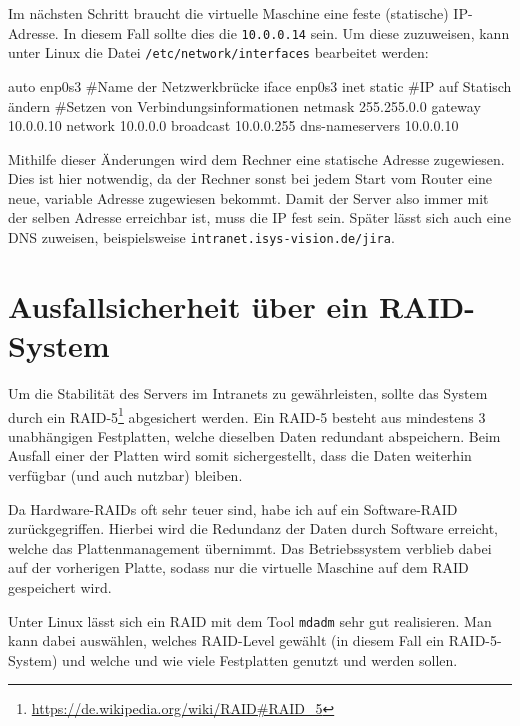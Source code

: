 Im nächsten Schritt braucht die virtuelle Maschine eine feste (statische) IP-Adresse.
In diesem Fall sollte dies die \texttt{10.0.0.14} sein. Um diese zuzuweisen, kann
unter Linux die Datei \texttt{/etc/network/interfaces} bearbeitet werden:

\begin{code}[language=bash, caption={Änderungen in \texttt{/etc/network/interfaces}}]
auto enp0s3 #Name der Netzwerkbrücke
iface enp0s3 inet static #IP auf Statisch ändern
#Setzen von Verbindungsinformationen
netmask 255.255.0.0
gateway 10.0.0.10
network 10.0.0.0
broadcast 10.0.0.255
dns-nameservers 10.0.0.10
\end{code}

Mithilfe dieser Änderungen wird dem Rechner eine statische Adresse zugewiesen. Dies
ist hier notwendig, da der Rechner sonst bei jedem Start vom Router eine neue, variable
Adresse zugewiesen bekommt. Damit der Server also immer mit der selben Adresse erreichbar
ist, muss die IP fest sein. Später lässt sich auch eine DNS zuweisen, beispielsweise
\texttt{intranet.isys-vision.de/jira}.



\section{Ausfallsicherheit über ein RAID-System}
\label{sec:jira-raid}

Um die Stabilität des Servers im Intranets zu gewährleisten, sollte das System durch
ein RAID-5\footnote{\url{https://de.wikipedia.org/wiki/RAID\#RAID\_5}} abgesichert
werden. Ein RAID-5 besteht aus mindestens 3 unabhängigen Festplatten, welche dieselben
Daten redundant abspeichern. Beim Ausfall einer der Platten wird somit sichergestellt,
dass die Daten weiterhin verfügbar (und auch nutzbar) bleiben.

Da Hardware-RAIDs oft sehr teuer sind, habe ich auf ein Software-RAID zurückgegriffen.
Hierbei wird die Redundanz der Daten durch Software erreicht, welche das Plattenmanagement
übernimmt. Das Betriebssystem verblieb dabei auf der vorherigen Platte, sodass nur
die virtuelle Maschine auf dem RAID gespeichert wird.

Unter Linux lässt sich ein RAID mit dem Tool \texttt{mdadm} sehr gut realisieren.
Man kann dabei auswählen, welches RAID-Level gewählt (in diesem Fall ein RAID-5-System)
und welche und wie viele Festplatten genutzt und werden sollen.
